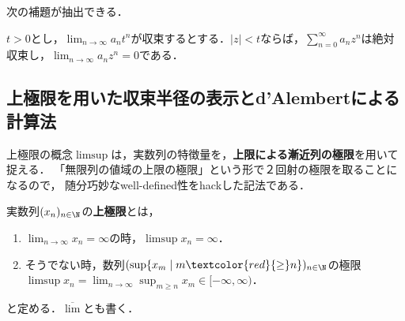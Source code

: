 \documentclass[uplatex, dvipdfmx]{jsreport}
\begin{document}
次の補題が抽出できる．

\begin{lemma}
    $t>0$とし，$\lim_{n\to\infty}a_nt^n$が収束するとする．$|z|<t$ならば，$\sum^\infty_{n=0}a_nz^n$は絶対収束し，$\lim_{n\to\infty}a_nz^n=0$である．
\end{lemma}

\subsection{上極限を用いた収束半径の表示とd'Alembertによる計算法}

\begin{screen}
    上極限の概念$\limsup$は，実数列の特徴量を，\textbf{上限による漸近列の極限}を用いて捉える．
    「無限列の値域の上限の極限」という形で２回射の極限を取ることになるので，
    随分巧妙なwell-defined性をhackした記法である．
\end{screen}

\begin{definition}
    実数列$(x_n)_{n\in\N}$の\textbf{上極限}とは，
    \begin{enumerate}
        \item $\lim_{n\to\infty}x_n=\infty$の時，$\limsup x_n=\infty$．
        \item そうでない時，数列$(\sup\{x_m\mid m\textcolor{red}{\ge}n\})_{n\in\N}$の極限$\limsup x_n=\lim_{n\to\infty}\sup_{m\ge n}x_m\in [-\infty,\infty)$．
    \end{enumerate}
    と定める．$\overline{\lim}$とも書く．
\end{definition}
\end{document}
